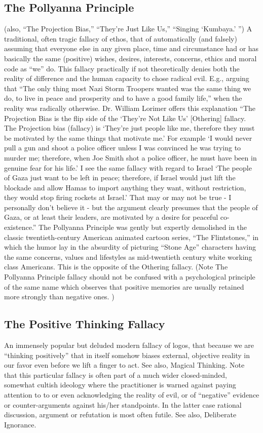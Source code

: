 \documentclass[10pt,a4paper,british]{article}
\begin{document}
\begin{multicols}{2}
    \subsection{The Pollyanna Principle} (also, ``The Projection Bias,'' ``They're Just Like Us,'' ``Singing `Kumbaya.' '')  A traditional, often tragic fallacy of ethos, that of automatically (and falsely) assuming that everyone else in any given place, time and circumstance had or has basically the same (positive) wishes, desires, interests, concerns, ethics and moral code as ``we'' do. This fallacy practically if not theoretically denies both the reality of difference and the human capacity to chose radical evil.  E.g., arguing that ``The only thing most Nazi Storm Troopers wanted was the same thing we do, to live in peace and prosperity and to have a good family life,'' when the reality was radically otherwise. Dr.  William Lorimer offers this explanation ``The Projection Bias is the flip side of the `They're Not Like Us' [Othering] fallacy. The Projection bias (fallacy) is `They're just people like me, therefore they must be motivated by the same things that motivate me.' For example `I would never pull a gun and shoot a police officer unless I was convinced he was trying to murder me; therefore, when Joe Smith shot a police officer, he must have been in genuine fear for his life.' I see the same fallacy with regard to Israel `The people of Gaza just want to be left in peace; therefore, if Israel would just lift the blockade and allow Hamas to import anything they want, without restriction, they would stop firing rockets at Israel.' That may or may not be true {-} I personally don't believe it {-} but the argument clearly presumes that the people of Gaza, or at least their leaders, are motivated by a desire for peaceful co{-}existence.'' The Pollyanna Principle was gently but expertly demolished in the classic twentieth{-}century American animated cartoon series, ``The Flintstones,'' in which the humor lay in the absurdity of picturing ``Stone Age'' characters having the same concerns, values and lifestyles as mid{-}twentieth century white working class Americans.  This is the opposite of the Othering fallacy. (Note The Pollyanna Principle fallacy should not be confused with a psychological principle of the same name which observes that positive memories are usually retained more strongly than negative ones. )   

    \subsection{The Positive Thinking Fallacy} An immensely popular but deluded modern fallacy of logos, that because we are ``thinking positively'' that in itself somehow biases external, objective reality in our favor even before we lift a finger to act. See also, Magical Thinking. Note that this particular fallacy is often part of a much wider closed{-}minded, somewhat cultish ideology where the practitioner is warned against paying attention to to or even acknowledging the reality of evil, or of ``negative'' evidence or counter{-}arguments against his/her standpoints. In the latter case rational discussion, argument or refutation is most often futile. See also, Deliberate Ignorance.  


\end{multicols}
\end{document}
